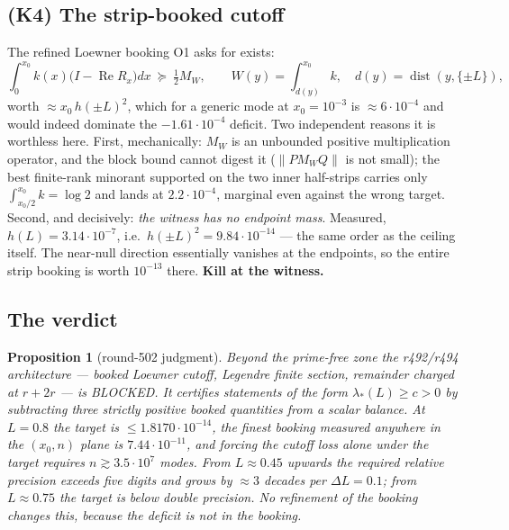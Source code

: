 \documentclass[11pt]{article}
\newtheorem{proposition}{Proposition}
\theoremstyle{remark}
\newcommand{\blocked}{\textcolor{red!65!black}{BLOCKED}}
\begin{document}
\subsection{(K4) The strip-booked cutoff}\label{sec:k4}

The refined Loewner booking O1 asks for exists:
\[
 \int_0^{x_0}\!k(x)\bigl(I-\operatorname{Re}R_x\bigr)dx
 \ \succeq\ \tfrac12M_{W},\qquad
 W(y)=\int_{d(y)}^{x_0}\!\!k,\quad d(y)=\operatorname{dist}(y,\{\pm L\}),
\]
worth $\approx x_0\,h(\pm L)^2$, which for a generic mode at
$x_0=10^{-3}$ is $\approx6\cdot10^{-4}$ and would indeed dominate the
$-1.61\cdot10^{-4}$ deficit.  Two independent reasons it is worthless
here.  First, mechanically: $M_W$ is an unbounded positive
multiplication operator, and the block bound cannot digest it
($\|P M_WQ\|$ is not small); the best finite-rank minorant supported
on the two inner half-strips carries only $\int_{x_0/2}^{x_0}k=\log2$
and lands at $2.2\cdot10^{-4}$, marginal even against the wrong
target.  Second, and decisively: \emph{the witness has no endpoint
mass}.  Measured, $h(L)=3.14\cdot10^{-7}$, i.e.\
$h(\pm L)^2=9.84\cdot10^{-14}$ --- the same order as the ceiling
itself.  The near-null direction essentially vanishes at the
endpoints, so the entire strip booking is worth $10^{-13}$ there.
\textbf{Kill at the witness.}

\subsection{The verdict}

\begin{proposition}[round-502 judgment]\label{prop:blocked}
Beyond the prime-free zone the r492/r494 architecture --- booked
Loewner cutoff, Legendre finite section, remainder charged at
$r+2r$ --- is \blocked{}.  It certifies statements of the form
$\lambda_*(L)\ge c>0$ by subtracting three strictly positive booked
quantities from a scalar balance.  At $L=0.8$ the target is
$\le1.8170\cdot10^{-14}$, the finest booking measured anywhere in the
$(x_0,n)$ plane is $7.44\cdot10^{-11}$, and forcing the cutoff loss
alone under the target requires $n\gtrsim3.5\cdot10^{7}$ modes.
From $L\approx0.45$ upwards the required relative precision exceeds
five digits and grows by $\approx3$ decades per $\Delta L=0.1$; from
$L\approx0.75$ the target is below double precision.  No refinement of
the booking changes this, because the deficit is not in the booking.
\end{proposition}
\end{document}
